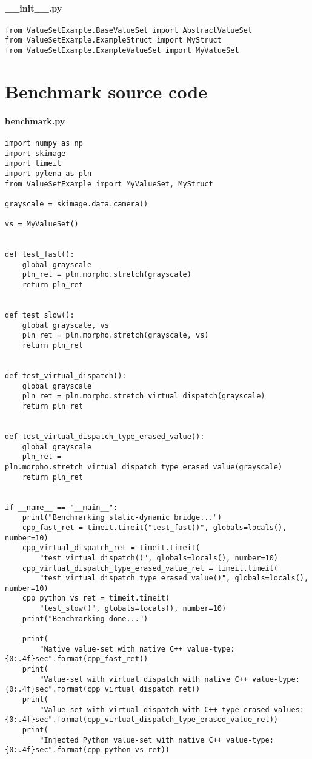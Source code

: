\paragraph{\_\_init\_\_.py}
\label{appendix:static-dynamic-bridge.python.vs.__init__.py}

\begin{verbatim}
from ValueSetExample.BaseValueSet import AbstractValueSet
from ValueSetExample.ExampleStruct import MyStruct
from ValueSetExample.ExampleValueSet import MyValueSet
\end{verbatim}


\clearpage

\section{Benchmark source code}
\label{appendix:static-dynamic-bridge.benchmark}

\paragraph{benchmark.py}
\label{appendix:static-dynamic-bridge.benchmark.py}

\begin{verbatim}
import numpy as np
import skimage
import timeit
import pylena as pln
from ValueSetExample import MyValueSet, MyStruct

grayscale = skimage.data.camera()

vs = MyValueSet()


def test_fast():
    global grayscale
    pln_ret = pln.morpho.stretch(grayscale)
    return pln_ret


def test_slow():
    global grayscale, vs
    pln_ret = pln.morpho.stretch(grayscale, vs)
    return pln_ret


def test_virtual_dispatch():
    global grayscale
    pln_ret = pln.morpho.stretch_virtual_dispatch(grayscale)
    return pln_ret


def test_virtual_dispatch_type_erased_value():
    global grayscale
    pln_ret = pln.morpho.stretch_virtual_dispatch_type_erased_value(grayscale)
    return pln_ret


if __name__ == "__main__":
    print("Benchmarking static-dynamic bridge...")
    cpp_fast_ret = timeit.timeit("test_fast()", globals=locals(), number=10)
    cpp_virtual_dispatch_ret = timeit.timeit(
        "test_virtual_dispatch()", globals=locals(), number=10)
    cpp_virtual_dispatch_type_erased_value_ret = timeit.timeit(
        "test_virtual_dispatch_type_erased_value()", globals=locals(), number=10)
    cpp_python_vs_ret = timeit.timeit(
        "test_slow()", globals=locals(), number=10)
    print("Benchmarking done...")

    print(
        "Native value-set with native C++ value-type: {0:.4f}sec".format(cpp_fast_ret))
    print(
        "Value-set with virtual dispatch with native C++ value-type: {0:.4f}sec".format(cpp_virtual_dispatch_ret))
    print(
        "Value-set with virtual dispatch with C++ type-erased values: {0:.4f}sec".format(cpp_virtual_dispatch_type_erased_value_ret))
    print(
        "Injected Python value-set with native C++ value-type: {0:.4f}sec".format(cpp_python_vs_ret))
\end{verbatim}
